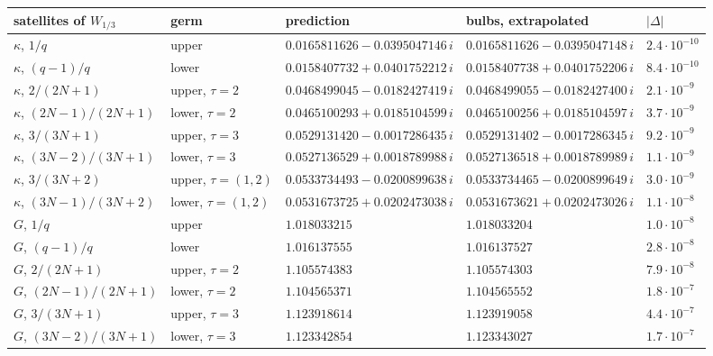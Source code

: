 \setlength{\tabcolsep}{4pt}
\begin{tabular}{@{}lllll@{}}
\toprule
satellites of $W_{1/3}$ & germ & prediction & bulbs, extrapolated & $|\Delta|$ \\
\midrule
$\kappa$, $1/q$ & upper & $0.0165811626 - 0.0395047146\,i$ & $0.0165811626 - 0.0395047148\,i$ & $2.4\cdot10^{-10}$ \\
$\kappa$, $(q-1)/q$ & lower & $0.0158407732 + 0.0401752212\,i$ & $0.0158407738 + 0.0401752206\,i$ & $8.4\cdot10^{-10}$ \\
$\kappa$, $2/(2N+1)$ & upper, $\tau=2$ & $0.0468499045 - 0.0182427419\,i$ & $0.0468499055 - 0.0182427400\,i$ & $2.1\cdot10^{-9}$ \\
$\kappa$, $(2N-1)/(2N+1)$ & lower, $\tau=2$ & $0.0465100293 + 0.0185104599\,i$ & $0.0465100256 + 0.0185104597\,i$ & $3.7\cdot10^{-9}$ \\
$\kappa$, $3/(3N+1)$ & upper, $\tau=3$ & $0.0529131420 - 0.0017286435\,i$ & $0.0529131402 - 0.0017286345\,i$ & $9.2\cdot10^{-9}$ \\
$\kappa$, $(3N-2)/(3N+1)$ & lower, $\tau=3$ & $0.0527136529 + 0.0018789988\,i$ & $0.0527136518 + 0.0018789989\,i$ & $1.1\cdot10^{-9}$ \\
$\kappa$, $3/(3N+2)$ & upper, $\tau=(1,2)$ & $0.0533734493 - 0.0200899638\,i$ & $0.0533734465 - 0.0200899649\,i$ & $3.0\cdot10^{-9}$ \\
$\kappa$, $(3N-1)/(3N+2)$ & lower, $\tau=(1,2)$ & $0.0531673725 + 0.0202473038\,i$ & $0.0531673621 + 0.0202473026\,i$ & $1.1\cdot10^{-8}$ \\
$G$, $1/q$ & upper & $1.018033215$ & $1.018033204$ & $1.0\cdot10^{-8}$ \\
$G$, $(q-1)/q$ & lower & $1.016137555$ & $1.016137527$ & $2.8\cdot10^{-8}$ \\
$G$, $2/(2N+1)$ & upper, $\tau=2$ & $1.105574383$ & $1.105574303$ & $7.9\cdot10^{-8}$ \\
$G$, $(2N-1)/(2N+1)$ & lower, $\tau=2$ & $1.104565371$ & $1.104565552$ & $1.8\cdot10^{-7}$ \\
$G$, $3/(3N+1)$ & upper, $\tau=3$ & $1.123918614$ & $1.123919058$ & $4.4\cdot10^{-7}$ \\
$G$, $(3N-2)/(3N+1)$ & lower, $\tau=3$ & $1.123342854$ & $1.123343027$ & $1.7\cdot10^{-7}$ \\
\bottomrule
\end{tabular}
